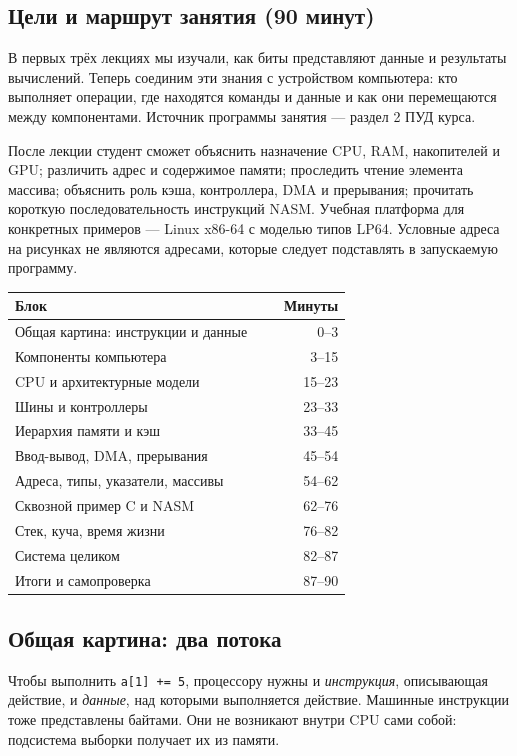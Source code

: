 \label{lecture04}
\subsection*{Цели и маршрут занятия (90 минут)}
В первых трёх лекциях мы изучали, как биты представляют данные и результаты
вычислений. Теперь соединим эти знания с устройством компьютера: кто выполняет
операции, где находятся команды и данные и как они перемещаются между
компонентами. Источник программы занятия --- раздел 2 ПУД курса.

После лекции студент сможет объяснить назначение CPU, RAM, накопителей и GPU;
различить адрес и содержимое памяти; проследить чтение элемента массива;
объяснить роль кэша, контроллера, DMA и прерывания; прочитать короткую
последовательность инструкций NASM. Учебная платформа для конкретных примеров
--- Linux x86-64 с моделью типов LP64. Условные адреса на рисунках не являются
адресами, которые следует подставлять в запускаемую программу.

\begin{center}
\small
\begin{tabular}{|p{0.73\linewidth}|r|}
\hline
Блок & Минуты \\
\hline
Общая картина: инструкции и данные & 0--3 \\
Компоненты компьютера & 3--15 \\
CPU и архитектурные модели & 15--23 \\
Шины и контроллеры & 23--33 \\
Иерархия памяти и кэш & 33--45 \\
Ввод-вывод, DMA, прерывания & 45--54 \\
Адреса, типы, указатели, массивы & 54--62 \\
Сквозной пример C и NASM & 62--76 \\
Стек, куча, время жизни & 76--82 \\
Система целиком & 82--87 \\
Итоги и самопроверка & 87--90 \\
\hline
\end{tabular}
\end{center}

\subsection{Общая картина: два потока}
Чтобы выполнить \texttt{a[1] += 5}, процессору нужны и \emph{инструкция},
описывающая действие, и \emph{данные}, над которыми выполняется действие.
Машинные инструкции тоже представлены байтами. Они не возникают внутри
CPU сами собой: подсистема выборки получает их из памяти.

